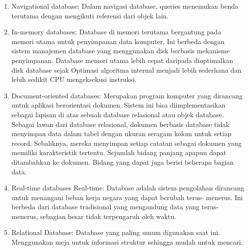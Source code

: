 \begin{enumerate}
		\item Navigational database: Dalam navigasi database, queries menemukan benda terutama dengan mengikuti referensi dari objek lain.
 
		\item In-memory databases: Database di memori terutama bergantung pada memori utama untuk penyimpanan data komputer. Ini berbeda dengan sistem manajemen database yang menggunakan disk berbasis mekanisme penyimpanan. Database memori utama lebih cepat daripada dioptimalkan disk database sejak Optimasi algoritma internal menjadi lebih sederhana dan lebih sedikit CPU mengeksekusi instruksi.

		\item Document-oriented databases: Merupakan program komputer yang dirancang untuk aplikasi berorientasi dokumen. Sistem ini bisa diimplementasikan sebagai lapisan di atas sebuah database relasional atau objek database. Sebagai lawan dari database relasional, dokumen berbasis database tidak menyimpan data dalam tabel dengan ukuran seragam kolom untuk setiap record. Sebaliknya, mereka menyimpan setiap catatan sebagai dokumen yang memiliki karakteristik tertentu. Sejumlah bidang panjang apapun dapat ditambahkan ke dokumen. Bidang yang dapat juga berisi beberapa bagian data. 
 
		\item Real-time databases Real-time: Database adalah sistem pengolahan dirancang untuk menangani beban kerja negara yang dapat berubah terus- menerus. Ini berbeda dari database tradisional yang mengandung data yang terus- menerus, sebagian besar tidak terpengaruh oleh waktu. 
 
		\item Relational Database: Database yang paling umum digunakan saat ini. Menggunakan meja untuk informasi struktur sehingga mudah untuk mencari.
	\end{enumerate}
 
 
